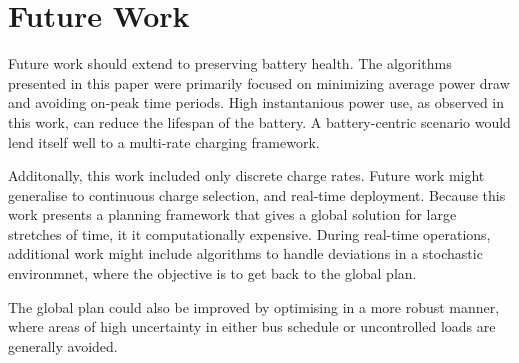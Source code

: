 \section{Future Work}
Future work should extend to preserving battery health.  The algorithms presented in this paper were primarily focused on minimizing average power draw and avoiding on-peak time periods.  High instantanious power use, as observed in this work, can reduce the lifespan of the battery.  A battery-centric scenario would lend itself well to a multi-rate charging framework.
\par Additonally, this work included only discrete charge rates.  Future work might generalise to continuous charge selection, and real-time deployment.  Because this work presents a planning framework that gives a global solution for large stretches of time, it it computationally expensive.  During real-time operations, additional work might include algorithms to handle deviations in a stochastic environmnet, where the objective is to get back to the global plan.  
\par The global plan could also be improved by optimising in a more robust manner, where areas of high uncertainty in either bus schedule or uncontrolled loads are generally avoided.
